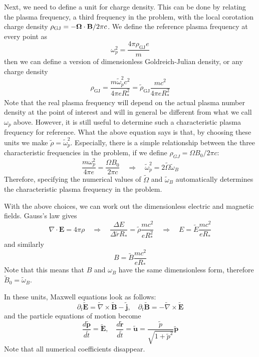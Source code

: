 Next, we need to define a unit for charge density. This can be done by relating
the plasma frequency, a third frequency in the problem, with the local
corotation charge density $\rho_\mathrm{GJ} = -\bm{\Omega}\cdot \mathbf{B}/2\pi c$. We
define the reference plasma frequency at every point as
\begin{equation}
  \omega_p^2 = \frac{4\pi \rho_\mathrm{GJ}e}{m}
\end{equation}
then we can define a version of dimensionless Goldreich-Julian density, or any charge density
\begin{equation}
  \rho_\mathrm{GJ} = \frac{m \tilde{\omega}_p^2 c^2}{4\pi e R_{*}^2} = \tilde{\rho}_\mathrm{GJ} \frac{mc^2}{4\pi eR_{*}^2}
\end{equation}
Note that the real plasma frequency will depend on the actual plasma number
density at the point of interest and will in general be different from what we
call $\omega_p$ above. However, it is still useful to determine such a
characteristic plasma frequency for reference. What the above equation says is
that, by choosing these units we make $\tilde{\rho} = \tilde{\omega}_p^2$.
Especially, there is a simple relationship between the three characteristic
frequencies in the problem, if we define $\rho_{GJ} = \Omega B_0 / 2\pi c$:
\begin{equation}
  \frac{m \omega_p^2}{4\pi e} = \frac{\Omega B_0}{2\pi c} \quad \Longrightarrow \quad \tilde{\omega}_p^2 = 2\tilde{\Omega} \tilde{\omega}_B
\end{equation}
Therefore, specifying the numerical values of $\tilde{\Omega}$ and
$\tilde{\omega}_B$ automatically determines the characteristic plasma frequency
in the problem.

With the above choices, we can work out the dimensionless electric and magnetic
fields. Gauss's law gives
\begin{equation}
  \nabla\cdot \mathbf{E} = 4\pi \rho \quad \Longrightarrow \quad \frac{\Delta E}{\Delta \tilde{r} R_{*}} = \tilde{\rho} \frac{m c^2}{e R_{*}^2} \quad \Longrightarrow \quad E = \tilde{E}\frac{m c^2}{e R_{*}}
\end{equation}
and similarly
\begin{equation}
    B = \tilde{B}\frac{m c^2}{e R_{*}}
\end{equation}
Note that this means that $B$ and $\omega_B$ have the same dimensionless form,
therefore $\tilde{B}_0 = \tilde{\omega}_B$.

In these units, Maxwell equations look as follows:
\begin{equation}
  \partial_t \tilde{\mathbf{E}} = \tilde{\nabla}\times \tilde{\mathbf{B}} - \tilde{\mathbf{j}},\quad \partial_t \tilde{\mathbf{B}} = - \tilde{\nabla}\times \tilde{\mathbf{E}}
\end{equation}
and the particle equations of motion become
\begin{equation}
  \frac{d \tilde{\mathbf{p}}}{d \tilde{t}} = \tilde{\mathbf{E}},\quad \frac{d \tilde{\mathbf{r}}}{d \tilde{t}} = \tilde{\mathbf{u}} = \frac{\tilde{p}}{\sqrt{1 + \tilde{p}^2}} \tilde{\mathbf{p}}
\end{equation}
Note that all numerical coefficients disappear.

